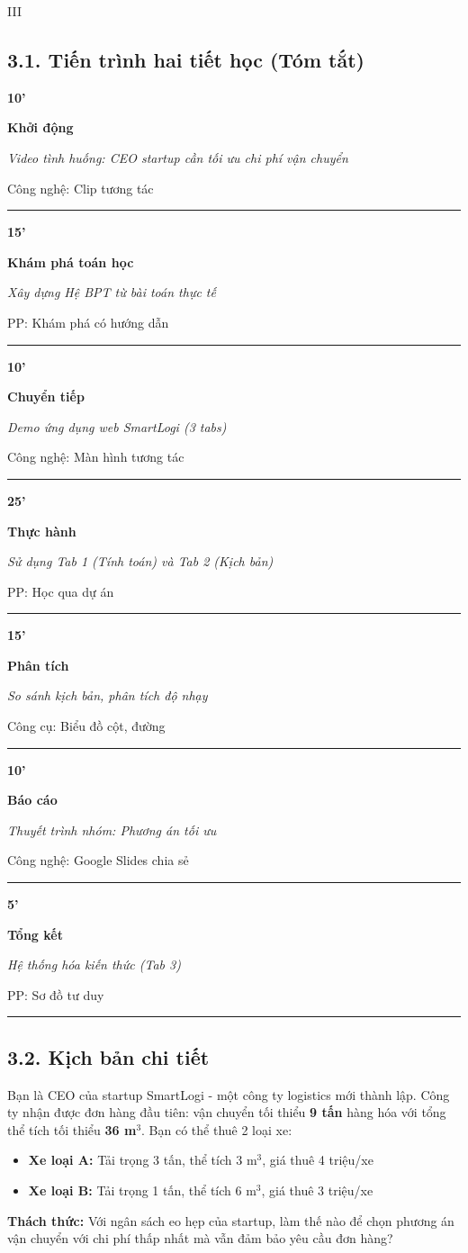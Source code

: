 \documentclass[12pt,a4paper]{article}
\newcommand{\teachingplan}[4]{
\noindent\begin{minipage}{0.12\textwidth}\centering\bfseries\sffamily\color{primary}#1\end{minipage}%
\begin{minipage}{0.23\textwidth}\sffamily\textbf{#2}\end{minipage}%
\begin{minipage}{0.35\textwidth}\textit{#3}\end{minipage}%
\begin{minipage}{0.25\textwidth}\small #4\end{minipage}
\vspace{1ex}\par\noindent\color{primary!30}\rule{\textwidth}{0.4pt}\vspace{1ex}}
\begin{document}
\begin{competitionsection}{III}
\vspace{0.5cm}
\subsection*{3.1. Tiến trình hai tiết học (Tóm tắt)}
\teachingplan{10'}{Khởi động}{Video tình huống: CEO startup cần tối ưu chi phí vận chuyển}{Công nghệ: Clip tương tác}
\teachingplan{15'}{Khám phá toán học}{Xây dựng Hệ BPT từ bài toán thực tế}{PP: Khám phá có hướng dẫn}
\teachingplan{10'}{Chuyển tiếp}{Demo ứng dụng web SmartLogi (3 tabs)}{Công nghệ: Màn hình tương tác}
\teachingplan{25'}{Thực hành}{Sử dụng Tab 1 (Tính toán) và Tab 2 (Kịch bản)}{PP: Học qua dự án}
\teachingplan{15'}{Phân tích}{So sánh kịch bản, phân tích độ nhạy}{Công cụ: Biểu đồ cột, đường}
\teachingplan{10'}{Báo cáo}{Thuyết trình nhóm: Phương án tối ưu}{Công nghệ: Google Slides chia sẻ}
\teachingplan{5'}{Tổng kết}{Hệ thống hóa kiến thức (Tab 3)}{PP: Sơ đồ tư duy}

\subsection*{3.2. Kịch bản chi tiết}

\begin{casestudy}
Bạn là CEO của startup SmartLogi - một công ty logistics mới thành lập. Công ty nhận được đơn hàng đầu tiên: vận chuyển tối thiểu \textbf{9 tấn} hàng hóa với tổng thể tích tối thiểu \textbf{36 m$^3$}. Bạn có thể thuê 2 loại xe:
\begin{itemize}[leftmargin=*,noitemsep]
\item \textbf{Xe loại A:} Tải trọng 3 tấn, thể tích 3 m$^3$, giá thuê 4 triệu/xe
\item \textbf{Xe loại B:} Tải trọng 1 tấn, thể tích 6 m$^3$, giá thuê 3 triệu/xe
\end{itemize}
\textbf{Thách thức:} Với ngân sách eo hẹp của startup, làm thế nào để chọn phương án vận chuyển với chi phí thấp nhất mà vẫn đảm bảo yêu cầu đơn hàng?
\end{casestudy}


\end{competitionsection}
\end{document}
